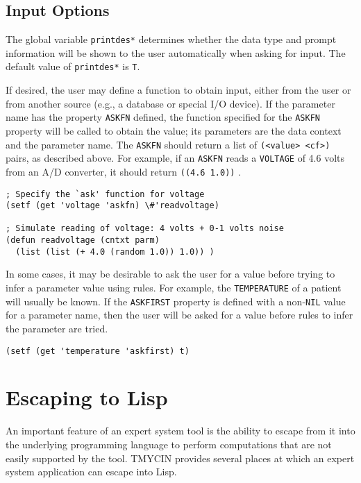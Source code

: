 \subsection{Input Options}

The global variable {\tt *printdes*} determines whether the data type and
prompt information will be shown to the user automatically when asking for
input.  The default value of {\tt *printdes*} is {\tt T}.

If desired, the user may define a function to obtain input, either
from the user or from another source (e.g., a database or special I/O
device).  If the parameter name has the property {\tt ASKFN} defined,
the function specified for the {\tt ASKFN} property will be called to
obtain the value; its parameters are the data context and the
parameter name.  The {\tt ASKFN} should return a list of
{\tt (<value>\ <cf>)} pairs, as described above.  For example, if an
{\tt ASKFN} reads a {\tt VOLTAGE} of 4.6 volts from an A/D converter, it
should return {\tt ((4.6\ 1.0))} .

\begin{verbatim}
; Specify the `ask' function for voltage
(setf (get 'voltage 'askfn) \#'readvoltage)

; Simulate reading of voltage: 4 volts + 0-1 volts noise
(defun readvoltage (cntxt parm)
  (list (list (+ 4.0 (random 1.0)) 1.0)) )
\end{verbatim}

In some cases, it may be desirable to ask the user for a value before
trying to infer a parameter value using rules.  For example, the
{\tt TEMPERATURE} of a patient will usually be known.  If the
{\tt ASKFIRST} property is defined with a non-{\tt NIL} value for a
parameter name, then the user will be asked for a value before rules
to infer the parameter are tried.

\begin{verbatim}
(setf (get 'temperature 'askfirst) t)
\end{verbatim}

\section{Escaping to Lisp}

An important feature of an expert system tool is the ability to escape from it
into the underlying programming language to perform computations that are not
easily supported by the tool.  TMYCIN provides several places at which an
expert system application can escape into Lisp.

